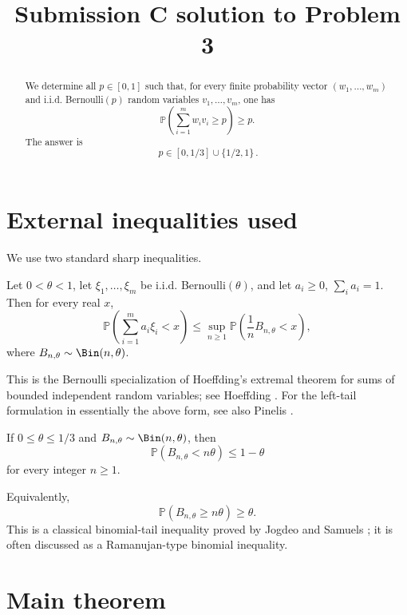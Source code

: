 \title{Submission C solution to Problem 3}
\date{}
\maketitle


\begin{abstract}
We determine all \(p\in[0,1]\) such that, for every finite probability vector
\((w_1,\ldots,w_m)\) and i.i.d. Bernoulli\((p)\) random variables
\(v_1,\ldots,v_m\), one has
\[
\mathbb P\!\left(\sum_{i=1}^m w_i v_i\ge p\right)\ge p.
\]
The answer is
\[
\boxed{\,p\in[0,1/3]\cup\{1/2,1\}\, }.
\]
\end{abstract}

\section*{External inequalities used}

We use two standard sharp inequalities.

\begin{lemma}
\label{lem:hoeffding}
Let \(0<\theta<1\), let \(\xi_1,\ldots,\xi_m\) be i.i.d. Bernoulli\((\theta)\), and let
\(a_i\ge0\), \(\sum_i a_i=1\). Then for every real \(x\),
\[
\mathbb P\!\left(\sum_{i=1}^m a_i\xi_i<x\right)
\le
\sup_{n\ge1}
\mathbb P\!\left(\frac1n B_{n,\theta}<x\right),
\]
where \(B_{n,\theta}\sim \Bin(n,\theta)\).
\end{lemma}

This is the Bernoulli specialization of Hoeffding's extremal theorem for sums of
bounded independent random variables; see Hoeffding \cite[Theorem 4]{Hoeffding1956}.
For the left-tail formulation in essentially the above form, see also Pinelis
\cite[Corollary 3.7]{Pinelis2016}.

\begin{lemma}
\label{lem:binomial}
If \(0\le \theta\le 1/3\) and \(B_{n,\theta}\sim \Bin(n,\theta)\), then
\[
\mathbb P(B_{n,\theta}<n\theta)\le 1-\theta
\]
for every integer \(n\ge1\).
\end{lemma}

Equivalently,
\[
\mathbb P(B_{n,\theta}\ge n\theta)\ge \theta .
\]
This is a classical binomial-tail inequality proved by Jogdeo and Samuels
\cite{JogdeoSamuels1968}; it is often discussed as a Ramanujan-type binomial
inequality.

\section*{Main theorem}

